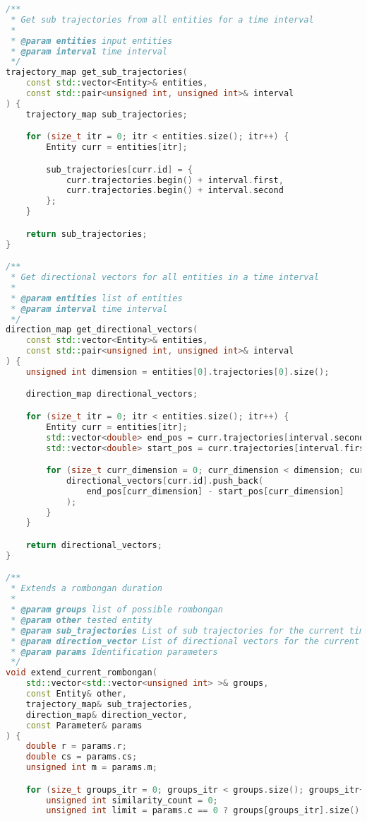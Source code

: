 \begin{lstlisting}[language=C++, caption=Implementasi fungsi \texttt{identify\_rombongan}, label={lamp:identify-rombongan}]
/**
 * Get sub trajectories from all entities for a time interval
 * 
 * @param entities input entities
 * @param interval time interval
 */
trajectory_map get_sub_trajectories(
    const std::vector<Entity>& entities,
    const std::pair<unsigned int, unsigned int>& interval
) {
    trajectory_map sub_trajectories;

    for (size_t itr = 0; itr < entities.size(); itr++) {
        Entity curr = entities[itr];

        sub_trajectories[curr.id] = {
            curr.trajectories.begin() + interval.first,
            curr.trajectories.begin() + interval.second
        };
    }

    return sub_trajectories;
}

/**
 * Get directional vectors for all entities in a time interval
 * 
 * @param entities list of entities
 * @param interval time interval
 */
direction_map get_directional_vectors(
    const std::vector<Entity>& entities,
    const std::pair<unsigned int, unsigned int>& interval
) {
    unsigned int dimension = entities[0].trajectories[0].size();

    direction_map directional_vectors;

    for (size_t itr = 0; itr < entities.size(); itr++) {
        Entity curr = entities[itr];
        std::vector<double> end_pos = curr.trajectories[interval.second - 1];
        std::vector<double> start_pos = curr.trajectories[interval.first];

        for (size_t curr_dimension = 0; curr_dimension < dimension; curr_dimension++) {
            directional_vectors[curr.id].push_back(
                end_pos[curr_dimension] - start_pos[curr_dimension]
            );
        }
    }

    return directional_vectors;
}

/**
 * Extends a rombongan duration
 * 
 * @param groups list of possible rombongan
 * @param other tested entity
 * @param sub_trajectories List of sub trajectories for the current time interval
 * @param direction_vector List of directional vectors for the current time interval
 * @param params Identification parameters
 */
void extend_current_rombongan(
    std::vector<std::vector<unsigned int> >& groups,
    const Entity& other,
    trajectory_map& sub_trajectories,
    direction_map& direction_vector,
    const Parameter& params
) {
    double r = params.r;
    double cs = params.cs;
    unsigned int m = params.m;

    for (size_t groups_itr = 0; groups_itr < groups.size(); groups_itr++) {
        unsigned int similarity_count = 0;
        unsigned int limit = params.c == 0 ? groups[groups_itr].size() : params.c;


\end{lstlisting}
